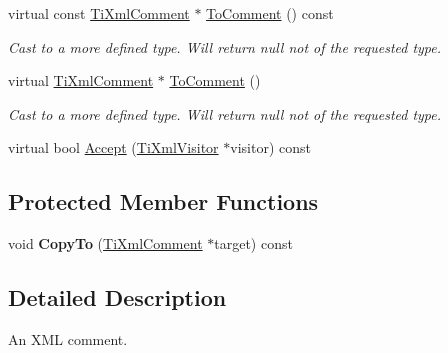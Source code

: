 \begin{DoxyCompactItemize}
\item 
\hypertarget{classTiXmlComment_a00fb4215c20a2399ea05ac9b9e7e68a0}{virtual const \hyperlink{classTiXmlComment}{\-Ti\-Xml\-Comment} $\ast$ \hyperlink{classTiXmlComment_a00fb4215c20a2399ea05ac9b9e7e68a0}{\-To\-Comment} () const }\label{classTiXmlComment_a00fb4215c20a2399ea05ac9b9e7e68a0}

\begin{DoxyCompactList}\small\item\em \-Cast to a more defined type. \-Will return null not of the requested type. \end{DoxyCompactList}\item 
\hypertarget{classTiXmlComment_acc7c7e07e13c23f17797d642981511df}{virtual \hyperlink{classTiXmlComment}{\-Ti\-Xml\-Comment} $\ast$ \hyperlink{classTiXmlComment_acc7c7e07e13c23f17797d642981511df}{\-To\-Comment} ()}\label{classTiXmlComment_acc7c7e07e13c23f17797d642981511df}

\begin{DoxyCompactList}\small\item\em \-Cast to a more defined type. \-Will return null not of the requested type. \end{DoxyCompactList}\item 
virtual bool \hyperlink{classTiXmlComment_a4382de0e50da973f11a23ea5852568bd}{\-Accept} (\hyperlink{classTiXmlVisitor}{\-Ti\-Xml\-Visitor} $\ast$visitor) const 
\end{DoxyCompactItemize}
\subsection*{\-Protected \-Member \-Functions}
\begin{DoxyCompactItemize}
\item 
\hypertarget{classTiXmlComment_a3175b2f27628f4fb7a043897930cd934}{void {\bfseries \-Copy\-To} (\hyperlink{classTiXmlComment}{\-Ti\-Xml\-Comment} $\ast$target) const }\label{classTiXmlComment_a3175b2f27628f4fb7a043897930cd934}

\end{DoxyCompactItemize}


\subsection{\-Detailed \-Description}
\-An \-X\-M\-L comment. 

